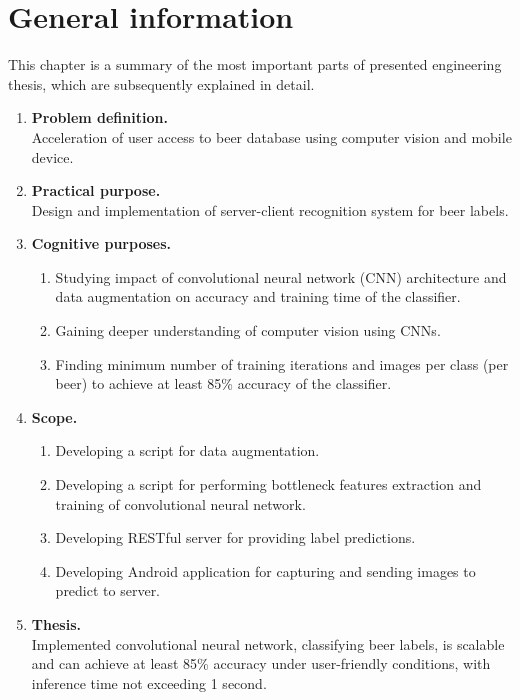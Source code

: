 \documentclass[11pt, a4paper]{article}
\makeatletter
\newcommand\polishtableofcontents{%
  \selectlanguage{polish}%
  \section*{\contentsname
    \@mkboth{%
      \MakeUppercase\contentsname}{\MakeUppercase\contentsname}}%
 \@starttoc{tos}%
  \selectlanguage{english}%
 }
\makeatother
\begin{document}
\thispagestyle{empty}
\tableofcontents
\clearpage

\thispagestyle{empty}
\polishtableofcontents
\clearpage

\setcounter{page}{1}

\section{General information} \label{general}
This chapter is a summary of the most important parts of presented engineering thesis, which are subsequently explained in detail.\\

\begin{enumerate}
\item \textbf{Problem definition.}\\
Acceleration of user access to beer database using computer vision and mobile device.

\item \textbf{Practical purpose.}\\
Design and implementation of server-client recognition system for beer labels.

\item \textbf{Cognitive purposes.}
	\begin{enumerate}
	\item Studying impact of convolutional neural network (CNN) architecture and data augmentation on accuracy and training time of the classifier.
	\item Gaining deeper understanding of computer vision using CNNs.
	\item Finding minimum number of training iterations and images per class (per beer) to achieve at least 85\% accuracy of the classifier.
	\end{enumerate}

\item \textbf{Scope.}
	\begin{enumerate}
	\item Developing a script for data augmentation.
	\item Developing a script for performing bottleneck features extraction and training of convolutional neural network.
	\item Developing RESTful server for providing label predictions.
	\item Developing Android application for capturing and sending images to predict to server.
	\end{enumerate}

\item \textbf{Thesis.}\\
Implemented convolutional neural network, classifying beer labels, is scalable and can achieve at least 85\% accuracy under user-friendly conditions, with inference time not exceeding 1 second.
\end{enumerate}
\clearpage
\end{document}
